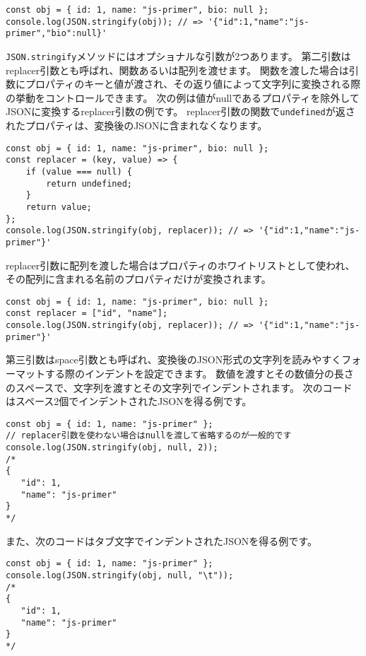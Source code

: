 \begin{lstlisting}
const obj = { id: 1, name: "js-primer", bio: null };
console.log(JSON.stringify(obj)); // => '{"id":1,"name":"js-primer","bio":null}'
\end{lstlisting}

\texttt{JSON.stringify}メソッドにはオプショナルな引数が2つあります。
第二引数はreplacer引数とも呼ばれ、関数あるいは配列を渡せます。
関数を渡した場合は引数にプロパティのキーと値が渡され、その返り値によって文字列に変換される際の挙動をコントロールできます。
次の例は値がnullであるプロパティを除外してJSONに変換するreplacer引数の例です。
replacer引数の関数で\texttt{undefined}が返されたプロパティは、変換後のJSONに含まれなくなります。

\begin{lstlisting}
const obj = { id: 1, name: "js-primer", bio: null };
const replacer = (key, value) => {
    if (value === null) {
        return undefined;
    }
    return value;
};
console.log(JSON.stringify(obj, replacer)); // => '{"id":1,"name":"js-primer"}'
\end{lstlisting}

replacer引数に配列を渡した場合はプロパティのホワイトリストとして使われ、
その配列に含まれる名前のプロパティだけが変換されます。

\begin{lstlisting}
const obj = { id: 1, name: "js-primer", bio: null };
const replacer = ["id", "name"];
console.log(JSON.stringify(obj, replacer)); // => '{"id":1,"name":"js-primer"}'
\end{lstlisting}

第三引数はspace引数とも呼ばれ、変換後のJSON形式の文字列を読みやすくフォーマットする際のインデントを設定できます。
数値を渡すとその数値分の長さのスペースで、文字列を渡すとその文字列でインデントされます。
次のコードはスペース2個でインデントされたJSONを得る例です。

\begin{lstlisting}
const obj = { id: 1, name: "js-primer" };
// replacer引数を使わない場合はnullを渡して省略するのが一般的です
console.log(JSON.stringify(obj, null, 2)); 
/*
{
   "id": 1,
   "name": "js-primer"
}
*/
\end{lstlisting}

また、次のコードはタブ文字でインデントされたJSONを得る例です。

\begin{lstlisting}
const obj = { id: 1, name: "js-primer" };
console.log(JSON.stringify(obj, null, "\t")); 
/*
{
   "id": 1,
   "name": "js-primer"
}
*/
\end{lstlisting}

